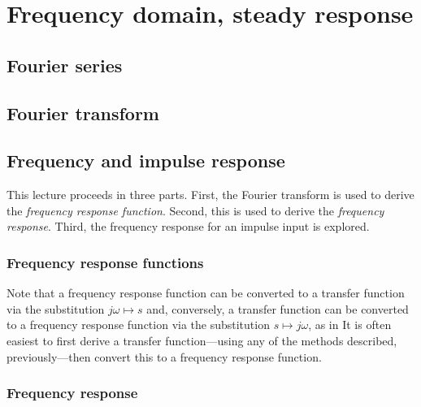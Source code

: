 \documentclass[dynamic_systems.tex]{subfiles}
\begin{document}
\chapter[Steady frequency domain]{Frequency domain, steady response}

\section{Fourier series}
\tags{}



\section{Fourier transform}
\tags{}



\section[Frequency and impulse response]{Frequency and impulse response}
\tags{}

This lecture proceeds in three parts.
First, the Fourier transform is used to derive the \emph{frequency response function}.
Second, this is used to derive the \emph{frequency response}.
Third, the frequency response for an impulse input is explored.
\tags{}

\subsection{Frequency response functions}
\tags{}


Note that a frequency response function can be converted to a transfer function via the substitution $j\omega \mapsto s$ and, conversely, a transfer function can be converted to a frequency response function via the substitution $s \mapsto j\omega$, as in
\tags{}
\noindent It is often easiest to first derive a transfer function---using any of the methods described, previously---then convert this to a frequency response function.

\subsection{Frequency response}
\tags{}
\end{document}
